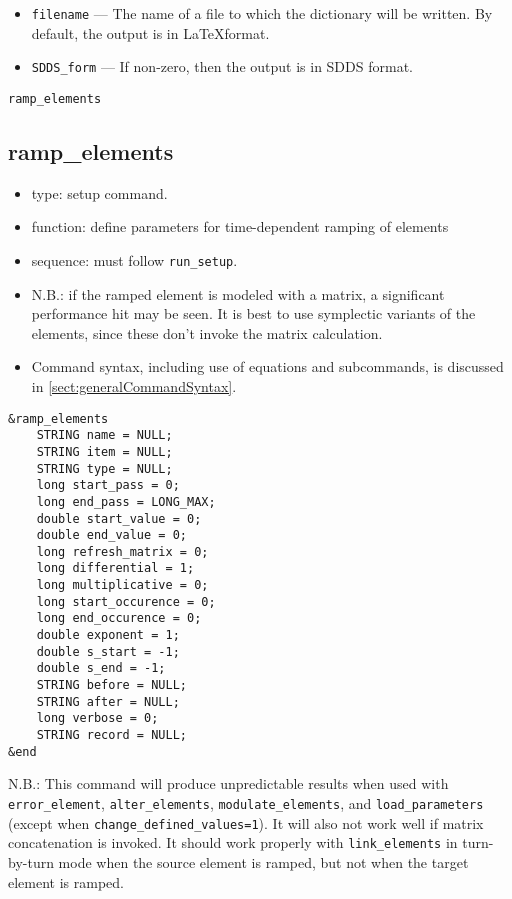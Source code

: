 \documentclass[11pt]{article}
\begin{document}
\begin{itemize}
\item \verb|filename| --- The name of a file to which the dictionary will be written.  By default, the 
  output is in \LaTeX format.
\item \verb|SDDS_form| --- If non-zero, then the output is in  SDDS format.
\end{itemize}

\newpage
\begin{center}{\Large\verb|ramp_elements|}\end{center}
\subsection{ramp\_elements\label{subsec:rampelements}}

\begin{itemize}
\item type: setup command.
\item function: define parameters for time-dependent ramping of elements
\item sequence: must follow \verb|run_setup|.
\item N.B.: if the ramped element is modeled with a matrix, a significant performance hit may be seen.
  It is best to use symplectic variants of the elements, since these don't invoke the matrix calculation.
\item Command syntax, including use of equations and subcommands, is discussed in \ref{sect:generalCommandSyntax}.
\end{itemize}

\begin{verbatim}
&ramp_elements
    STRING name = NULL;
    STRING item = NULL;
    STRING type = NULL;
    long start_pass = 0;
    long end_pass = LONG_MAX;
    double start_value = 0;
    double end_value = 0;
    long refresh_matrix = 0;
    long differential = 1;
    long multiplicative = 0;
    long start_occurence = 0;
    long end_occurence = 0;
    double exponent = 1;
    double s_start = -1;
    double s_end = -1;
    STRING before = NULL;
    STRING after = NULL;
    long verbose = 0;
    STRING record = NULL;
&end
\end{verbatim}

N.B.: This command will produce unpredictable results when used with
\verb|error_element|, \verb|alter_elements|, \verb|modulate_elements|, and
\verb|load_parameters| (except when \verb|change_defined_values=1|).
It will also not work well if matrix concatenation is invoked.
It should work properly with \verb|link_elements| in turn-by-turn mode
when the source element is ramped, but not when the target element
is ramped.
\end{document}
